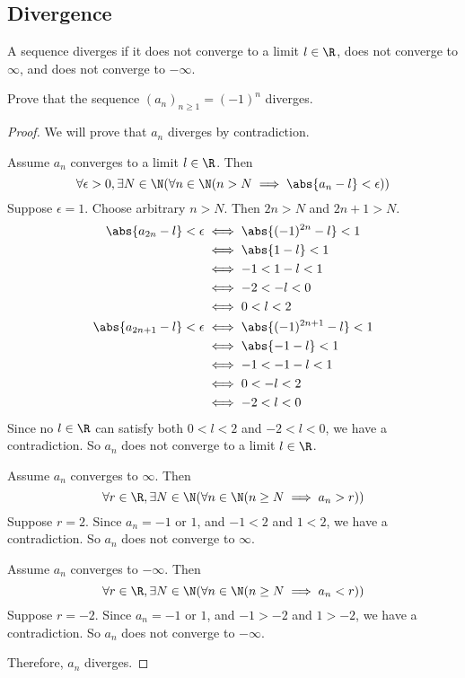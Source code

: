 \subsection{Divergence}
A sequence diverges if it does not converge to a limit $l \in \R$, does not converge to $\infty$, and does not converge to $-\infty$.
\begin{eg}
  Prove that the sequence $(a_n)_{n \geq 1} = (-1) ^ n$ diverges.
\end{eg}
\begin{proof}
  We will prove that $a_n$ diverges by contradiction.

  Assume $a_n$ converges to a limit $l \in \R$.
  Then 
  \[
    \forall \epsilon > 0, \exists N \in \N (\forall n \in \N (n > N \implies \abs{a_n - l} < \epsilon))
    \]
  Suppose $\epsilon = 1$. Choose arbitrary $n > N$. Then $2n > N$ and $2n + 1 > N$.
  \begin{align*}
    \abs{a_{2n} - l} < \epsilon &\iff \abs{(-1) ^ {2n} - l} < 1 \\
    &\iff \abs{1 - l} < 1 \\
    &\iff -1 < 1 - l < 1 \\
    &\iff -2 < -l < 0 \\
    &\iff 0 < l < 2 \\
    \abs{a_{2n + 1} - l} < \epsilon &\iff \abs{(-1) ^ {2n + 1} - l} < 1 \\
    &\iff \abs{-1 - l} < 1 \\
    &\iff -1 < -1 - l < 1 \\
    &\iff 0 < -l < 2 \\
    &\iff -2 < l < 0
  \end{align*}
  Since no $l \in \R$ can satisfy both $0 < l < 2$ and $-2 < l < 0$, we have a contradiction.
  So $a_n$ does not converge to a limit $l \in \R$.

  Assume $a_n$ converges to $\infty$.
  Then 
  \[
    \forall r \in \R, \exists N \in \N (\forall n \in \N (n \geq N \implies a_n > r))
    \]
  Suppose $r = 2$. Since $a_n = -1$ or $1$, and $-1 < 2$ and $1 < 2$, we have a contradiction.
  So $a_n$ does not converge to $\infty$.

  Assume $a_n$ converges to $-\infty$.
  Then 
  \[
    \forall r \in \R, \exists N \in \N (\forall n \in \N (n \geq N \implies a_n < r))
    \]
  Suppose $r = -2$. Since $a_n = -1$ or $1$, and $-1 > -2$ and $1 > -2$, we have a contradiction.
  So $a_n$ does not converge to $-\infty$.

  Therefore, $a_n$ diverges.
\end{proof}


